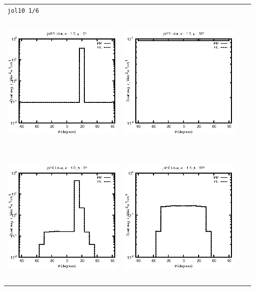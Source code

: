 \begin{tabular}{c c c c}
\multicolumn{4}{l}{\texttt{jol10 1/6}} \\
\includegraphics[height=7cm]{../eps/jol10_Ld_a_fwd.eps} &
\includegraphics[height=7cm]{../eps/jol10_Ld_a_cross.eps}\\
\includegraphics[height=7cm]{../eps/jol10_Ld_w_fwd.eps} &
\includegraphics[height=7cm]{../eps/jol10_Ld_w_cross.eps} \\

\end{tabular}
